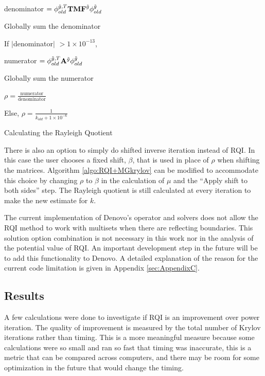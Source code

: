 %
\begin{algorithm}[!h]
  \begin{list}{}{\hspace{2.5em}}
    \item denominator $= \phi_{old}^{\tilde{g}, T} \mathbf{TMF}^{\tilde{g}} \phi_{old}^{\tilde{g}}$
    \item Globally sum the denominator
    \item If $|$denominator$|$ $> 1 \times 10^{-13}$, 
      \begin{list}{}{\hspace{1em}}
        \item numerator  $= \phi_{old}^{\tilde{g}, T} \mathbf{A}^{\tilde{g}} \phi_{old}^{\tilde{g}}$
        \item Globally sum the numerator
        \item $\rho = \frac{\text{numerator}}{\text{denominator}}$
      \end{list}
    \item Else, $\rho = \frac{1}{k_{old} + 1 \times 10^{-6}}$ 
  \end{list}
  \caption{Calculating the Rayleigh Quotient}
  \label{algo:calcRQ}
\end{algorithm}

There is also an option to simply do shifted inverse iteration instead of RQI. In this case the user chooses a fixed shift, $\beta$, that is used in place of $\rho$ when shifting the matrices. Algorithm \ref{algo:RQI+MGkrylov} can be modified to accommodate this choice by changing $\rho$ to $\beta$ in the calculation of $\mu$ and the ``Apply shift to both sides'' step. The Rayleigh quotient is still calculated at every iteration to make the new estimate for $k$. 

The current implementation of Denovo's operator and solvers does not allow the RQI method to work with multisets when there are reflecting boundaries. This solution option combination is not necessary in this work nor in the analysis of the potential value of RQI. An important development step in the future will be to add this functionality to Denovo. A detailed explanation of the reason for the current code limitation is given in Appendix \ref{sec:AppendixC}.

\subsection{Results}
A few calculations were done to investigate if RQI is an improvement over power iteration. The quality of improvement is measured by the total number of Krylov iterations rather than timing. This is a more meaningful measure because some calculations were so small and ran so fast that timing was inaccurate, this is a metric that can be compared across computers, and there may be room for some optimization in the future that would change the timing. 

